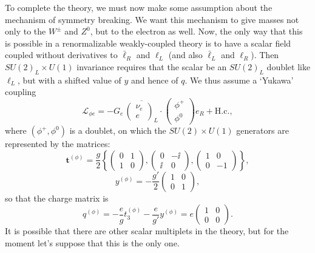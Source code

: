 To complete the theory, we must now make some assumption about the mechanism of symmetry breaking. We want this mechanism to give masses not only to the $W^\pm$ and $Z^0$, but to the electron as well. Now, the only way that this is possible in a renormalizable weakly-coupled theory is to have a scalar field coupled without derivatives to $\bar\ell_R$ and $\ell_L$ (and also $\bar\ell_L$ and $\ell_R$). Then $SU(2)_L\times U(1)$ invariance requires that the scalar be an $SU(2)_L$ doublet like $\ell_L$, but with a shifted value of $y$ and hence of $q$. We thus assume a `Yukawa' coupling
\begin{equation}
\mathcal{L}_{\phi e}
=-G_e\,
\overline{\begin{pmatrix}\nu_e\\e\end{pmatrix}_{\!L}}
\cdot
\begin{pmatrix}\phi^+\\\phi^0\end{pmatrix}
e_R+\mathrm{H.c.},
\tag{21.3.21}\label{eq:21.3.21}
\end{equation}
where $(\phi^+,\phi^0)$ is a doublet, on which the $SU(2)\times U(1)$ generators are represented by the matrices:
\begin{equation}
\mathbf{t}^{(\phi)}
=\frac{g}{2}
\left\{
\begin{pmatrix}0&1\\1&0\end{pmatrix},
\begin{pmatrix}0&-\ii\\\ii&0\end{pmatrix},
\begin{pmatrix}1&0\\0&-1\end{pmatrix}
\right\},
\tag{21.3.22}\label{eq:21.3.22}
\end{equation}
\begin{equation}
y^{(\phi)}=-\frac{g'}{2}
\begin{pmatrix}1&0\\0&1\end{pmatrix},
\tag{21.3.23}\label{eq:21.3.23}
\end{equation}
so that the charge matrix is
\begin{equation}
q^{(\phi)}
=-\frac{e}{g}t_3^{(\phi)}-\frac{e}{g'}y^{(\phi)}
=e\begin{pmatrix}1&0\\0&0\end{pmatrix}.
\tag{21.3.24}\label{eq:21.3.24}
\end{equation}
It is possible that there are other scalar multiplets in the theory, but for the moment let's suppose that this is the only one.

